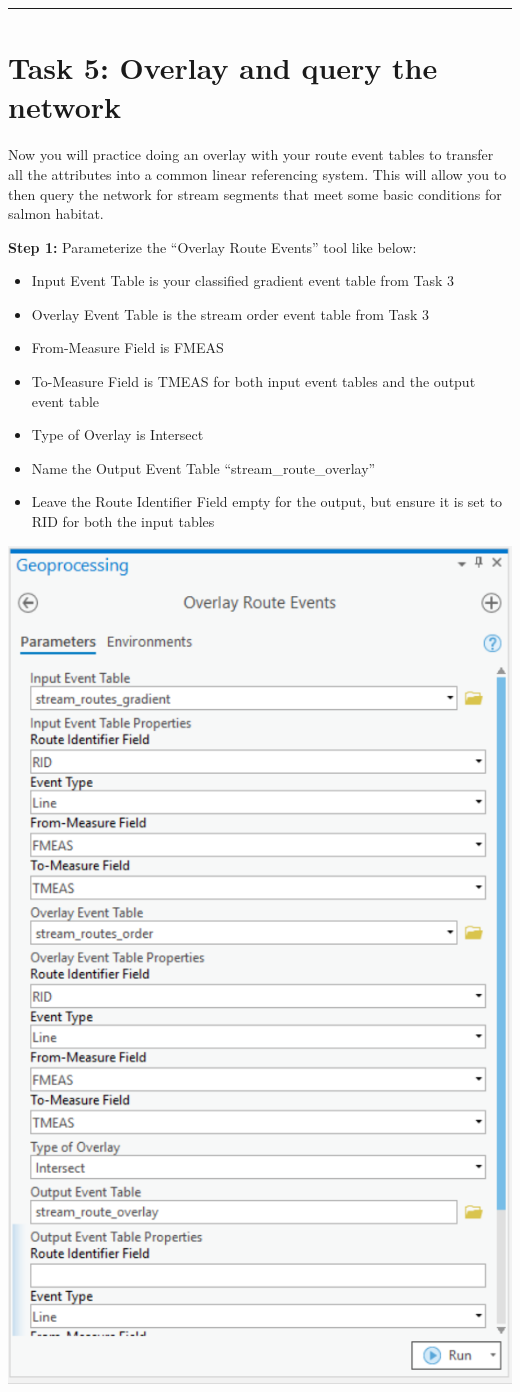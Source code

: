 \documentclass[
]{book}
\begin{document}
\begin{center}\rule{0.5\linewidth}{0.5pt}\end{center}

\hypertarget{task-5-overlay-and-query-the-network}{%
\section{Task 5: Overlay and query the network}\label{task-5-overlay-and-query-the-network}}

Now you will practice doing an overlay with your route event tables to transfer all the attributes into a common linear referencing system. This will allow you to then query the network for stream segments that meet some basic conditions for salmon habitat.

\textbf{Step 1:} Parameterize the ``Overlay Route Events'' tool like below:

\begin{itemize}
\item
  Input Event Table is your classified gradient event table from Task 3
\item
  Overlay Event Table is the stream order event table from Task 3
\item
  From-Measure Field is FMEAS
\item
  To-Measure Field is TMEAS for both input event tables and the output event table
\item
  Type of Overlay is Intersect
\item
  Name the Output Event Table ``stream\_route\_overlay''
\item
  Leave the Route Identifier Field empty for the output, but ensure it is set to RID for both the input tables
\end{itemize}

\includegraphics[width=0.5\linewidth]{images/02-overlay-route-events}
\end{document}
